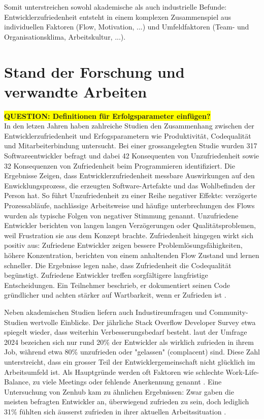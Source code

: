 \documentclass[12pt,a4paper]{report}
\newcommand{\question}[1]{\colorbox{yellow}{\textbf{QUESTION: #1}}\\}
\begin{document}
Somit unterstreichen sowohl akademische als auch industrielle Befunde: Entwicklerzufriedenheit entsteht in einem komplexen
Zusammenspiel aus individuellen Faktoren (Flow, Motivation, ...) und Umfeldfaktoren (Team- und Organisationsklima, Arbeitskultur, 
...).

\section{Stand der Forschung und verwandte Arbeiten}

\question{Definitionen für Erfolgsparameter einfügen?}
In den letzen Jahren haben zahlreiche Studien den Zusammenhang zwischen der Entwicklerzufriedenheit und Erfogsparametern wie 
Produktivität, Codequalität und Mitarbeiterbindung untersucht. Bei einer grossangelegten Studie wurden 317 Softwareentwickler
befragt und dabei 42 Konsequenten von Unzufriedenheit sowie 32 Konsequenzen von Zufriedenheit beim Programmieren identifiziert.
Die Ergebnisse Zeigen, dass Entwicklerzufriedenheit messbare Auswirkungen auf den Enwicklungsprozess, die erzeugten 
Software-Artefakte und das Wohlbefinden der Person hat. So führt Unzufriedenheit zu einer Reihe negativer Effekte: verzögerte
Prozessabläufe, nachlässige Arbeitsweise und häufige unterbrechungen des Flows wurden als typische Folgen von negativer Stimmung
genannt. Unzufriedene Entwickler berichten von langen langen Verzögerungen oder Qualitätsproblemen, weil Frustration sie aus dem
Konzept brachte. Zufriedenheit hingegen wirkt sich positiv aus: Zufriedene Entwickler zeigen bessere Problemlösungsfähigkeiten,
höhere Konzentration, berichten von einem anhaltenden Flow Zustand und lernen schneller. Die Ergebnisse legen nahe, dass 
Zufriedenheit die Codequalität begünstigt. Zufriedene Entwickler treffen sorgfältigere langfristige Entscheidungen. Ein Teilnehmer
beschrieb, er dokumentiert seinen Code gründlicher und achten stärker auf Wartbarkeit, wenn er Zufrieden ist 
\cite{graziotin_what_2018}.

Neben akademischen Studien liefern auch Industireumfragen und Community-Studien wertvolle Einblicke. Der jährliche Stack Overflow
Developer Survey etwa spiegelt wieder, dass weiterhin Verbesserungsbedarf besteht. laut der Umfrage 2024 bezeichen sich nur rund 
20\% der Entwickler als wirklich zufrieden in ihrem Job, während etwa 80\% unzufrieden oder "gelassen" (complacent) sind. Diese Zahl
unterstreicht, dass ein grosser Teil der Entwicklergemeinschaft nicht glücklich im Arbeitsumfeld ist. Als Hauptgründe werden oft
Faktoren wie schlechte Work-Life-Balance, zu viele Meetings oder fehlende Anerkennung genannt \cite{stackoverflow_survey_2025}. Eine
Untersuchung von Zenhub kam zu ähnlichen Ergebnissen: Zwar gaben die meisten befragten Entwickler an, überwiegend zufrieden zu sein,
doch lediglich 31\% fühlten sich äusserst zufrieden in ihrer aktuellen Arbeitssituation \cite{zenhub_2022_nodate}. 
\end{document}
